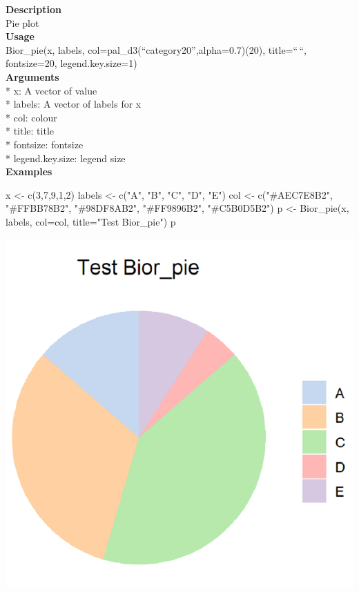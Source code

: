 \documentclass[
]{book}
\newenvironment{Shaded}{\begin{snugshade}}{\end{snugshade}}
\newcommand{\AttributeTok}[1]{\textcolor[rgb]{0.77,0.63,0.00}{#1}}
\newcommand{\DecValTok}[1]{\textcolor[rgb]{0.00,0.00,0.81}{#1}}
\newcommand{\FunctionTok}[1]{\textcolor[rgb]{0.00,0.00,0.00}{#1}}
\newcommand{\NormalTok}[1]{#1}
\newcommand{\OtherTok}[1]{\textcolor[rgb]{0.56,0.35,0.01}{#1}}
\newcommand{\StringTok}[1]{\textcolor[rgb]{0.31,0.60,0.02}{#1}}
\begin{document}
\textbf{Description}\\
Pie plot\\
\textbf{Usage}\\
Bior\_pie(x, labels, col=pal\_d3(``category20'',alpha=0.7)(20), title=``\,``, fontsize=20, legend.key.size=1)\\
\textbf{Arguments}\\
* x: A vector of value\\
* labels: A vector of labels for x\\
* col: colour\\
* title: title\\
* fontsize: fontsize\\
* legend.key.size: legend size\\
\textbf{Examples}\\

\begin{Shaded}
\begin{Highlighting}[]
\NormalTok{x }\OtherTok{\textless{}{-}} \FunctionTok{c}\NormalTok{(}\DecValTok{3}\NormalTok{,}\DecValTok{7}\NormalTok{,}\DecValTok{9}\NormalTok{,}\DecValTok{1}\NormalTok{,}\DecValTok{2}\NormalTok{)}
\NormalTok{labels }\OtherTok{\textless{}{-}} \FunctionTok{c}\NormalTok{(}\StringTok{"A"}\NormalTok{, }\StringTok{"B"}\NormalTok{, }\StringTok{"C"}\NormalTok{, }\StringTok{"D"}\NormalTok{, }\StringTok{"E"}\NormalTok{)}
\NormalTok{col }\OtherTok{\textless{}{-}} \FunctionTok{c}\NormalTok{(}\StringTok{"\#AEC7E8B2"}\NormalTok{, }\StringTok{"\#FFBB78B2"}\NormalTok{, }\StringTok{"\#98DF8AB2"}\NormalTok{, }\StringTok{"\#FF9896B2"}\NormalTok{, }\StringTok{"\#C5B0D5B2"}\NormalTok{)}
\NormalTok{p }\OtherTok{\textless{}{-}} \FunctionTok{Bior\_pie}\NormalTok{(x, labels, }\AttributeTok{col=}\NormalTok{col, }\AttributeTok{title=}\StringTok{"Test Bior\_pie"}\NormalTok{)}
\NormalTok{p}
\end{Highlighting}
\end{Shaded}

\includegraphics{images/Bior_pie.png}
\end{document}
